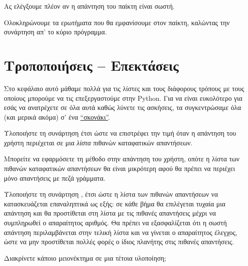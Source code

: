 \documentclass[a4paper,11pt,oneside]{book}
\begin{document}
Ας ελέγξουμε πλέον αν η απάντηση του παίκτη είναι σωστή.


Ολοκληρώνουμε τα ερωτήματα που θα εμφανίσουμε στον παίκτη, καλώντας την συνάρτηση απ' το κύριο πρόγραμμα.






\section{Τροποποιήσεις -- Επεκτάσεις}

Στο κεφάλαιο αυτό μάθαμε πολλά για τις λίστες και τους διάφορους τρόπους με τους οποίους μπορούμε να τις επεξεργαστούμε στην Python. Για να είναι ευκολότερο για εσάς να ανατρέχετε σε όλα αυτά καθώς λύνετε τις ασκήσεις, τα συγκεντρώσαμε όλα (και μερικά ακόμα) σ' ένα%
\href{http://pythonies.mysch.gr/cslists.pdf}{``σκονάκι''}.

\begin{exercise}
Υλοποιήστε τη συνάρτηση  έτσι ώστε να επιστρέφει την τιμή  όταν η απάντηση του χρήστη περιέχεται σε μια \emph{λίστα} πιθανών καταφατικών απαντήσεων. 

\begin{note}
Μπορείτε να εφαρμόσετε τη μέθοδο  στην απάντηση του χρήστη, οπότε η λίστα των πιθανών καταφατικών απαντήσεων θα είναι μικρότερη αφού θα πρέπει να περιέχει μόνο απαντήσεις με πεζά γράμματα.
\end{note}
\end{exercise}

\begin{exercise}
Υλοποιήστε τη συνάρτηση , έτσι ώστε η λίστα των πιθανών απαντήσεων να κατασκευάζεται επαναληπτικά ως εξής: σε κάθε βήμα θα επιλέγεται τυχαία μια απάντηση και θα προστίθεται στη λίστα με τις πιθανές απαντήσεις μέχρι να συμπληρωθεί ο απαραίτητος αριθμός. Θα πρέπει να εξασφαλίζεται ότι η σωστή απάντηση περιλαμβάνεται στην τελική λίστα και να γίνεται ο απαραίτητος έλεγχος, ώστε να μην προστίθεται πολλές φορές ο ίδιος πλανήτης στις πιθανές απαντήσεις.

Διακρίνετε κάποιο μειονέκτημα σε μια τέτοια υλοποίηση;
\end{exercise}
\end{document}
